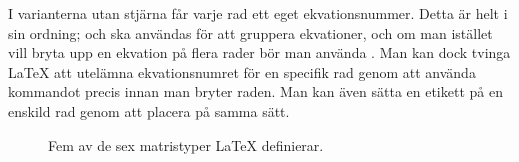 \documentclass[lang=sv,ptsize=10pt,font=none,nomath,titles=bf,../../a4.tex]{subfiles}
\begin{document}
I varianterna utan stjärna får varje rad ett eget ekvationsnummer. Detta
är helt i sin ordning;  och  ska användas för att
gruppera ekvationer, och om man istället vill bryta upp en ekvation på
flera rader bör man använda . Man kan dock tvinga \LaTeX{}
att utelämna ekvationsnumret för en specifik rad genom att använda
kommandot  precis innan man bryter raden. Man kan även
sätta en etikett på en enskild rad genom att placera  på samma
sätt.

\begin{figure}[b]
	\centering 
	\caption{Fem av de sex matristyper \AmS\LaTeX{} definierar.}
	\label{fig:matriser}
\end{figure}
\end{document}
